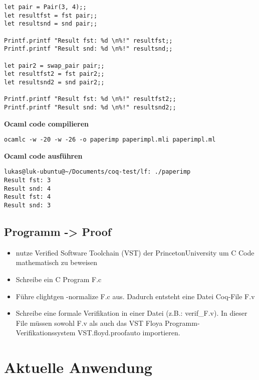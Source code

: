\begin{lstlisting}[language=coq,firstnumber=1,caption=Ocaml Code anpassen,label=lst:practical-code-adjustment]
let pair = Pair(3, 4);;
let resultfst = fst pair;;
let resultsnd = snd pair;;

Printf.printf "Result fst: %d \n%!" resultfst;;
Printf.printf "Result snd: %d \n%!" resultsnd;;

let pair2 = swap_pair pair;;
let resultfst2 = fst pair2;;
let resultsnd2 = snd pair2;;

Printf.printf "Result fst: %d \n%!" resultfst2;;
Printf.printf "Result snd: %d \n%!" resultsnd2;;
\end{lstlisting}

\textbf{Ocaml code compilieren}
\begin{lstlisting}[language=coq,firstnumber=1,caption=Ocaml Code compilieren,label=lst:practical-code-compilation]
ocamlc -w -20 -w -26 -o paperimp paperimpl.mli paperimpl.ml
\end{lstlisting}

\textbf{Ocaml code ausführen}
\begin{lstlisting}[language=coq,firstnumber=1,caption=Ocaml code ausführen,label=lst:practical-code-execution]
lukas@luk-ubuntu@~/Documents/coq-test/lf: ./paperimp
Result fst: 3 
Result snd: 4 
Result fst: 4 
Result snd: 3 
\end{lstlisting}

\subsection{Programm -> Proof}
\begin{itemize}
	\item nutze Verified Software Toolchain (VST) der PrincetonUniversity um C Code mathematisch zu beweisen
	\item Schreibe ein C Program F.c
	\item Führe clightgen -normalize F.c aus. Dadurch entsteht eine Datei Coq-File F.v
	\item Schreibe eine formale Verifikation in einer Datei (z.B.: verif\_F.v). In dieser File müssen sowohl F.v als auch das VST Floya Programm-Verifikationssystem VST.floyd.proofauto importieren.\cite{Appel01:VST}
\end{itemize}

\section{Aktuelle Anwendung}
